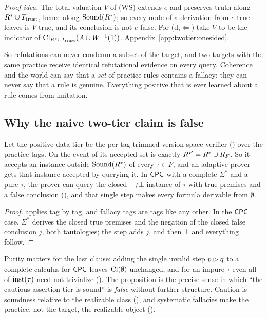 \noindent\emph{Proof idea.} The total valuation $V$ of (WS) extends $e$ and preserves truth along $R^{*}\cup T_{\mathrm{trust}}$, hence along $\mathrm{Sound}(R^{*})$; so every node of a derivation from $e$-true leaves is $V$-true, and its conclusion is not $e$-false. For (d,$\Leftarrow$) take $V$ to be the indicator of $\mathrm{Cl}_{R^{*}\cup T_{\mathrm{trust}}}(A\cup W^{-1}(1))$. Appendix~\ref{app:twotier:onesided}.

So refutations can never condemn a subset of the target, and two targets with the same practice receive identical refutational evidence on every query. Coherence and the world can say that a \emph{set} of practice rules contains a fallacy; they can never say that a rule is genuine. Everything positive that is ever learned about a rule comes from imitation.

\subsection{Why the naive two-tier claim is false}\label{sec:twotier:naive}

\begin{proposition}\label{prop:twotier:practice}
Let the positive-data tier be the per-tag trimmed version-space verifier () over the practice tags. On the event of  its accepted set is exactly $R^P=R^{*}\cup R_F$. So it accepts an instance outside $\mathrm{Sound}(R^{*})$ of every $\tau\in F$, and an adaptive prover gets that instance accepted by querying it. In $\mathsf{CPC}$ with a complete $\Sigma^*$ and a pure $\tau$, the prover can query the closed $\top/\bot$ instance of $\tau$ with true premises and a false conclusion (), and that single step makes every formula derivable from $\emptyset$.
\end{proposition}

\begin{proof}
 applies tag by tag, and fallacy tags are tags like any other. In the $\mathsf{CPC}$ case, $\Sigma^*$ derives the closed true premises and the negation of the closed false conclusion $j$, both tautologies; the step adds $j$, and then $\bot$ and everything follow.
\end{proof}

Purity matters for the last clause: adding the single invalid step $p\rhd q$ to a complete calculus for $\mathsf{CPC}$ leaves $\mathrm{Cl}(\emptyset)$ unchanged, and for an impure $\tau$ even all of $\mathrm{inst}(\tau)$ need not trivialize (). The proposition is the precise sense in which ``the cautious assertion tier is sound'' is \emph{false} without further structure. Caution is soundness relative to the realizable class (), and systematic fallacies make the practice, not the target, the realizable object ().

